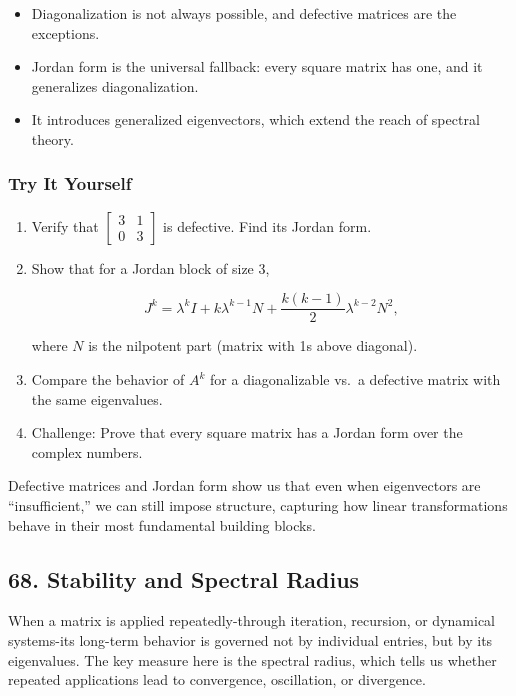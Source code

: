\documentclass[
  letterpaper,
  DIV=11,
  numbers=noendperiod]{scrreprt}
\providecommand{\tightlist}{%
  \setlength{\itemsep}{0pt}\setlength{\parskip}{0pt}}
\begin{document}
\begin{itemize}
\tightlist
\item
  Diagonalization is not always possible, and defective matrices are the
  exceptions.
\item
  Jordan form is the universal fallback: every square matrix has one,
  and it generalizes diagonalization.
\item
  It introduces generalized eigenvectors, which extend the reach of
  spectral theory.
\end{itemize}

\subsubsection{Try It Yourself}\label{try-it-yourself-66}

\begin{enumerate}
\def\labelenumi{\arabic{enumi}.}
\item
  Verify that \(\begin{bmatrix} 3 & 1 \\ 0 & 3 \end{bmatrix}\) is
  defective. Find its Jordan form.
\item
  Show that for a Jordan block of size 3,

  \[
  J^k = \lambda^k I + k \lambda^{k-1} N + \frac{k(k-1)}{2}\lambda^{k-2} N^2,
  \]

  where \(N\) is the nilpotent part (matrix with 1s above diagonal).
\item
  Compare the behavior of \(A^k\) for a diagonalizable vs.~a defective
  matrix with the same eigenvalues.
\item
  Challenge: Prove that every square matrix has a Jordan form over the
  complex numbers.
\end{enumerate}

Defective matrices and Jordan form show us that even when eigenvectors
are ``insufficient,'' we can still impose structure, capturing how
linear transformations behave in their most fundamental building blocks.

\subsection{68. Stability and Spectral
Radius}\label{stability-and-spectral-radius}

When a matrix is applied repeatedly-through iteration, recursion, or
dynamical systems-its long-term behavior is governed not by individual
entries, but by its eigenvalues. The key measure here is the spectral
radius, which tells us whether repeated applications lead to
convergence, oscillation, or divergence.
\end{document}
